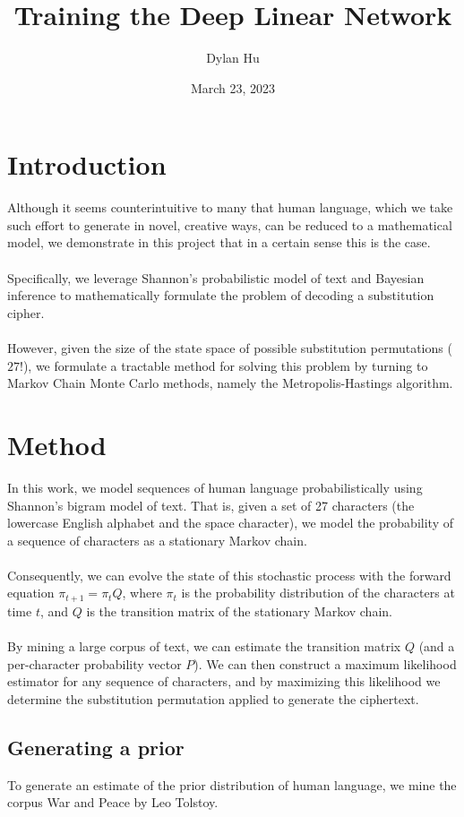 \documentclass[11pt]{article}
\title{Training the Deep Linear Network}
\author{Dylan Hu}
\date{March 23, 2023}
\begin{document}
\maketitle
\tableofcontents

\section{Introduction}
Although it seems counterintuitive to many that human language, which we take such effort to generate in novel, creative ways, can be reduced to a mathematical model, we demonstrate in this project that in a certain sense this is the case.
\\\\
Specifically, we leverage Shannon's probabilistic model of text and Bayesian inference to mathematically formulate the problem of decoding a substitution cipher.
\\\\
However, given the size of the state space of possible substitution permutations ($27!$), we formulate a tractable method for solving this problem by turning to Markov Chain Monte Carlo methods, namely the Metropolis-Hastings algorithm.

\pagebreak

\section{Method}
In this work, we model sequences of human language probabilistically using Shannon's bigram model of text. That is, given a set of 27 characters (the lowercase English alphabet and the space character), we model the probability of a sequence of characters as a stationary Markov chain.
\\\\
Consequently, we can evolve the state of this stochastic process with the forward equation $\pi_{t+1} = \pi_t Q$, where $\pi_t$ is the probability distribution of the characters at time $t$, and $Q$ is the transition matrix of the stationary Markov chain.
\\\\
By mining a large corpus of text, we can estimate the transition matrix $Q$ (and a per-character probability vector $P$). We can then construct a maximum likelihood estimator for any sequence of characters, and by maximizing this likelihood we determine the substitution permutation applied to generate the ciphertext.

\subsection{Generating a prior}
To generate an estimate of the prior distribution of human language, we mine the corpus War and Peace by Leo Tolstoy.
\end{document}
